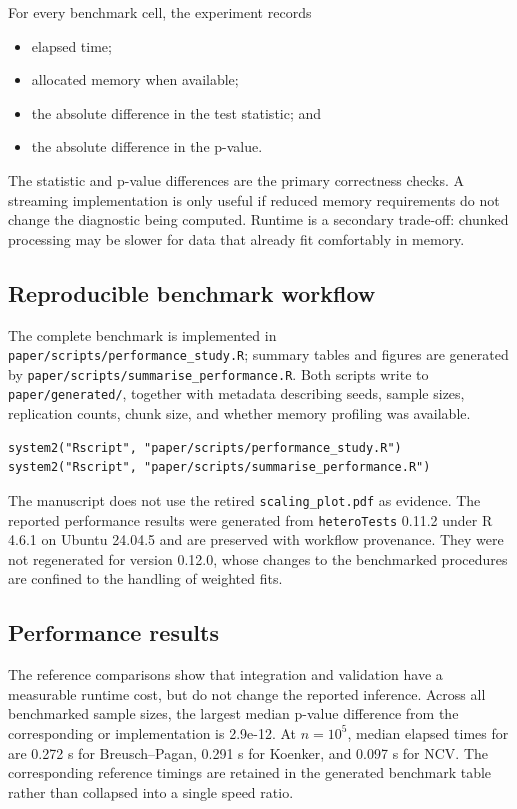 For every benchmark cell, the experiment records

\begin{itemize}
\tightlist
\item
  elapsed time;
\item
  allocated memory when available;
\item
  the absolute difference in the test statistic; and
\item
  the absolute difference in the p-value.
\end{itemize}

The statistic and p-value differences are the primary correctness checks. A
streaming implementation is only useful if reduced memory requirements do not
change the diagnostic being computed. Runtime is a secondary trade-off: chunked
processing may be slower for data that already fit comfortably in memory.

\subsection{Reproducible benchmark workflow}\label{reproducible-benchmark-workflow}

The complete benchmark is implemented in \texttt{paper/scripts/performance\_study.R}; summary
tables and figures are generated by \texttt{paper/scripts/summarise\_performance.R}. Both
scripts write to \texttt{paper/generated/}, together with metadata describing seeds,
sample sizes, replication counts, chunk size, and whether memory profiling was
available.

\begin{verbatim}
system2("Rscript", "paper/scripts/performance_study.R")
system2("Rscript", "paper/scripts/summarise_performance.R")
\end{verbatim}

The manuscript does not use the retired \texttt{scaling\_plot.pdf} as evidence. The
reported performance results were generated from \texttt{heteroTests} 0.11.2 under
R 4.6.1 on Ubuntu 24.04.5 and are preserved with workflow provenance. They
were not regenerated for version 0.12.0, whose changes to the benchmarked
procedures are confined to the handling of weighted fits.

\subsection{Performance results}\label{performance-results}

The reference comparisons show that integration and validation have a measurable
runtime cost, but do not change the reported inference. Across all benchmarked
sample sizes, the largest median p-value difference from the corresponding
 or  implementation is
2.9e-12.
At \(n=10^5\), median elapsed times for  are
0.272 s
for Breusch--Pagan,
0.291 s
for Koenker, and
0.097 s
for NCV. The corresponding reference timings are retained in the generated
benchmark table rather than collapsed into a single speed ratio.

